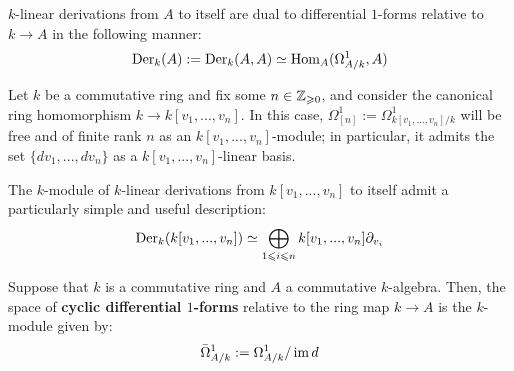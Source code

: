         \begin{corollary}
            $k$-linear derivations from $A$ to itself are dual to differential $1$-forms relative to $k \to A$ in the following manner:
                $$\mathrm{Der}_k(A) := \mathrm{Der}_k(A, A) \simeq \mathrm{Hom}_A(\Omega^1_{A/k}, A)$$
        \end{corollary}
        \begin{lemma}
            \cite[\href{https://stacks.math.columbia.edu/tag/00RX}{Tag 00RX}]{stacks} Let $k$ be a commutative ring and fix some $n \in \mathbb{Z}_{\geqslant 0}$, and consider the canonical ring homomorphism $k \to k[v_1, ..., v_n]$. In this case, $\Omega^1_{[n]} := \Omega^1_{k[v_1, ..., v_n]/k}$ will be free and of finite rank $n$ as an $k[v_1, ..., v_n]$-module; in particular, it admits the set $\{dv_1, ..., dv_n\}$ as a $k[v_1, ..., v_n]$-linear basis.
        \end{lemma}
        \begin{corollary}
            The $k$-module of $k$-linear derivations from $k[v_1, ..., v_n]$ to itself admit a particularly simple and useful description:
                $$\mathrm{Der}_k(k[v_1, ..., v_n]) \simeq \bigoplus_{1 \leqslant i \leqslant n} k[v_1, ..., v_n] \partial_{v_i}$$
        \end{corollary}

        \begin{definition}
            Suppose that $k$ is a commutative ring and $A$ a commutative $k$-algebra. Then, the space of \textbf{cyclic differential $1$-forms} relative to the ring map $k \to A$ is the $k$-module given by:
                $$\bar{\Omega}^1_{A/k} := \Omega^1_{A/k}/\operatorname{im} d$$
        \end{definition}

